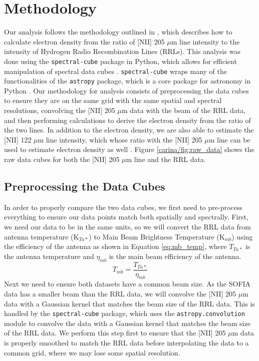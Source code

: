 \section{Methodology}
Our analysis follows the methodology outlined in \cite{pineda2018}, which describes how to calculate electron density from the ratio of [NII] 205 $\mu$m line intensity to the intensity of Hydrogen Radio Recombination Lines (RRLs).
This analysis was done using the \texttt{spectral-cube} package in Python, which allows for efficient manipulation of spectral data cubes \citep{robitaille2016spectral}.
\texttt{spectral-cube} wraps many of the functionalities of the \texttt{astropy} package, which is a core package for astronomy in Python \citep{astropy:2013, astropy:2018, astropy:2022}.
Our methodology for analysis consists of preprocessing the data cubes to ensure they are on the same grid with the same spatial and spectral resolutions, convolving the [NII] 205 $\mu$m data with the beam of the RRL data, and then performing calculations to derive the electron density from the ratio of the two lines.
In addition to the electron density, we are also able to estimate the [NII] 122 $\mu$m line intensity, which whose ratio with the [NII] 205 $\mu$m line can be used to estimate electron density as well \citep{goldsmith2015herschel}.
Figure \ref{carina/fig:raw_data} shows the raw data cubes for both the [NII] 205 $\mu$m line and the RRL data.

\subsection{Preprocessing the Data Cubes}
In order to properly compare the two data cubes, we first need to pre-process everything to ensure our data points match both spatially and spectrally.
First, we need our data to be in the same units, so we will convert the RRL data from antenna temperature (K$_{Ta*}$) to Main Beam Brightness Temperature (K$_{mb}$) using the efficiency of the antenna as shown in Equation \ref{eq:mb_temp}, where $T_{Ta*}$ is the antenna temperature and $\eta_{mb}$ is the main beam efficiency of the antenna.
\begin{equation}
    T_{mb} = \frac{T_{Ta*}}{\eta_{mb}}
    \label{eq:mb_temp}
\end{equation}
Next we need to ensure both datasets have a common beam size.
As the SOFIA data has a smaller beam than the RRL data, we will convolve the [NII] 205 $\mu$m data with a Gaussian kernel that matches the beam size of the RRL data.
This is handled by the \texttt{spectral-cube} package, which uses the \texttt{astropy.convolution} module to convolve the data with a Gaussian kernel that matches the beam size of the RRL data.
We perform this step first to ensure that the [NII] 205 $\mu$m data is properly smoothed to match the RRL data before interpolating the data to a common grid, where we may lose some spatial resolution. 

